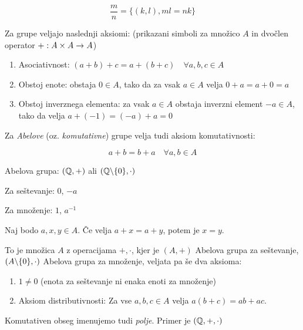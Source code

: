 \[
	\frac{m}{n} = \{(k, l), ml = nk\}
\]


Za grupe veljajo naslednji aksiomi: (prikazani simboli za množico $A$ in dvočlen operator $+: A \times A \rightarrow A$)
\begin{enumerate}
	\item Asociativnost: $(a+b)+c = a+(b+c) \quad \forall a, b, c \in A$
	\item Obstoj enote: obstaja $0 \in A$, tako da za vsak $a \in A$ velja $0+a = a+0 = a$
	\item Obstoj inverznega elementa: za vsak $a \in A$ obstaja inverzni element $-a \in A$, tako da velja $a + (-1) = (-a) + a = 0$
\end{enumerate}

Za \textit{Abelove} (oz. \textit{komutativne}) grupe velja tudi aksiom komutativnosti:

\[
	a + b = b + a \quad \forall a, b \in A
\]


Abelova grupa: $(\mathbb{Q}, +)$ ali $(\mathbb{Q} \backslash \{0\}, \cdot)$


Za seštevanje: $0$, $-a$

Za množenje: $1$, $a^{-1}$


Naj bodo $a, x, y \in A$. Če velja $a + x = a + y$, potem je $x=y$.


To je množica $A$ z operacijama $+, \cdot$, kjer je $(A, +)$ Abelova grupa za seštevanje, $(A \backslash \{0\}, \cdot)$ Abelova grupa za množenje, veljata pa še dva aksioma:

\begin{enumerate}
	\item $1 \ne 0$ (enota za seštevanje ni enaka enoti za množenje)
	\item Aksiom distributivnosti: Za vse $a, b, c \in A$ velja $a(b+c) = ab+ac$.
\end{enumerate}

Komutativen obseg imenujemo tudi \textit{polje}. Primer je $(\mathbb{Q}, +, \cdot)$~

